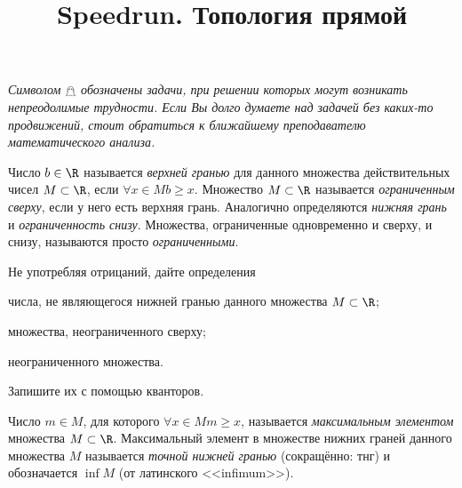 \documentclass[a4paper, 12pt, num=2729, date=01.09.2020]{listok}
\begin{document}
\makeatletter{}
\renewcommand{\listok@num}{\faRocket}
\makeatother{}

\title{Speedrun. Топология прямой}
\maketitle{}

\setlength{\abovedisplayskip}{5pt plus 2pt minus 2pt}
\setlength{\belowdisplayskip}{5pt plus 2pt minus 2pt}

\begin{center}
    \textit{Символом $\mathghost$ обозначены задачи, при решении которых могут возникать непреодолимые трудности.
    Если Вы долго думаете над задачей без каких-то продвижений, стоит обратиться к ближайшему преподавателю математического анализа.}
\end{center}

\begin{definition}
    Число $b \in \R$ называется \textit{верхней гранью} для данного множества действительных чисел $M \subset \R$,
    если $\forall{x \in M} b \ge x$. Множество $M \subset \R$ называется \textit{ограниченным сверху}, если у него есть верхняя грань.
    Аналогично определяются \textit{нижняя грань} и \textit{ограниченность снизу}.
    Множества, ограниченные одновременно и сверху, и снизу, называются просто \textit{ограниченными}.
\end{definition}

\begin{problem}
    Не употребляя отрицаний, дайте определения
    \begin{probparts}
        \item числа, не являющегося нижней гранью данного множества $M \subset \R$;
        \item множества, неограниченного сверху;
        \item неограниченного множества.
    \end{probparts}
    Запишите их с помощью кванторов.
\end{problem}

\begin{definition}
    Число $m \in M$, для которого $\forall{x \in M} m \ge x$, называется \textit{максимальным элементом} множества $M \subset \R$.
    Максимальный элемент в множестве нижних граней данного множества $M$ называется \textit{точной нижней гранью} (сокращённо: тнг) и обозначается $\inf M$ (от латинского <<infimum>>).
\end{definition}
\end{document}
